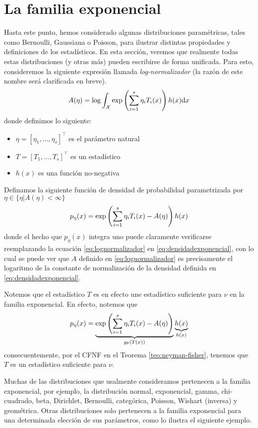 \section{La familia exponencial}

Hasta este punto, hemos considerado algunas distribuciones paramétricas, tales como Bernoulli, Gaussiana o Poisson, para ilustrar distintas propiedades y definiciones de los estadísticos. En esta sección, veremos que realmente todas estas distribuciones (y otras más) pueden escribirse de forma unificada. Para esto, consideremos la siguiente expresión llamada \textit{log-normalizador} (la razón de este nombre será clarificada en breve).
\begin{equation}
	\label{eq:lognormalizador}
	A(\eta) = \log\int_{\mathcal X} \exp\left(\sum_{i=1}^s\eta_iT_i(x)\right)h(x){\text{d}x}
\end{equation}
donde definimos lo siguiente:
\begin{itemize}
	\item $\eta = [\eta_1,\ldots,\eta_s]^\top$ es el parámetro natural
	\item $T = [T_1,\ldots,T_s]^\top$ es un estadístico
	\item $h(x)$ es una función no-negativa
\end{itemize}
Definamos la siguiente función de densidad de probabilidad parametrizada por $\eta\in\{\eta | A(\eta)<\infty\}$
\begin{equation}
	\label{eq:densidadexponencial}
 	p_\eta(x) = \exp\left(\sum_{i=1}^s\eta_iT_i(x)-A(\eta)\right)h(x)
 \end{equation} 
 donde el hecho que $p_\eta(x)$ integra uno puede claramente verificarse reemplazando la ecuación \eqref{eq:lognormalizador} en \eqref{eq:densidadexponencial}, con lo cual se puede ver que $A$ definido en \eqref{eq:lognormalizador} es precisamente el logaritmo de la constante de normalización de la densidad definida en \eqref{eq:densidadexponencial}.

 Notemos que el estadístico $T$ es en efecto une estadístico suficiente para $\nu$ en la familia exponencial. En efecto, notemos que 
 \begin{equation}
	\label{eq:densidadexponencial2}
 	p_\eta(x) = \underbrace{\exp\left(\sum_{i=1}^s\eta_iT_i(x)-A(\eta)\right)}_{g_\theta(T(x))}\underbrace{h(x)}_{h(x)}
 \end{equation} 
consecuentemente, por el CFNF en el Teorema \ref{teo:neyman-fisher}, tenemos que $T$ es 
un estadístico suficiente para $\nu$.

Muchas de las distribuciones que usalmente consideramos pertenecen a la familia exponencial, por ejemplo, la distribución normal, exponencial, gamma, chi-cuadrado, beta, Dirichlet, Bernoulli, categórica, Poisson, Wishart (inversa) y geométrica. Otras distribuciones solo pertenecen a la familia exponencial para una determinada elección de sus parámetros, como lo ilustra el siguiente ejemplo.


